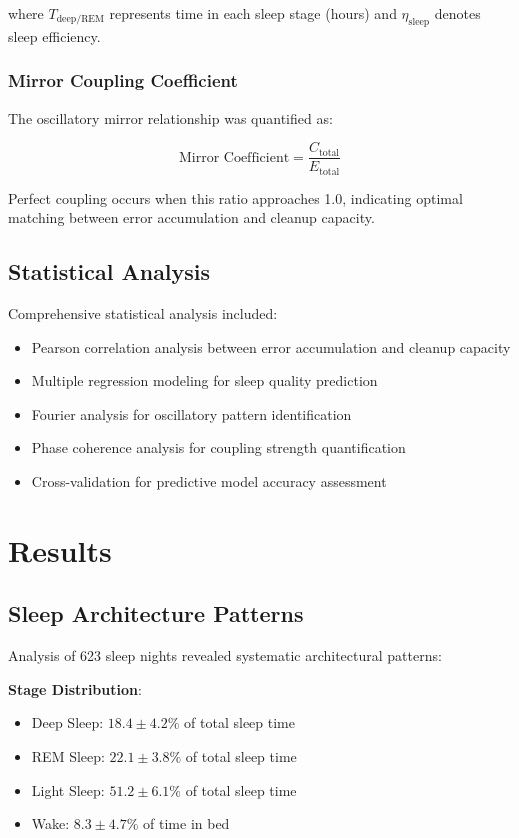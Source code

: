 \documentclass[twocolumn]{article}
\begin{document}
where $T_{\text{deep/REM}}$ represents time in each sleep stage (hours) and $\eta_{\text{sleep}}$ denotes sleep efficiency.

\subsubsection{Mirror Coupling Coefficient}

The oscillatory mirror relationship was quantified as:

\begin{equation}
\text{Mirror Coefficient} = \frac{C_{\text{total}}}{E_{\text{total}}}
\label{eq:mirror_coefficient}
\end{equation}

Perfect coupling occurs when this ratio approaches 1.0, indicating optimal matching between error accumulation and cleanup capacity.

\subsection{Statistical Analysis}

Comprehensive statistical analysis included:

\begin{itemize}
\item Pearson correlation analysis between error accumulation and cleanup capacity
\item Multiple regression modeling for sleep quality prediction
\item Fourier analysis for oscillatory pattern identification
\item Phase coherence analysis for coupling strength quantification
\item Cross-validation for predictive model accuracy assessment
\end{itemize}

\section{Results}

\subsection{Sleep Architecture Patterns}

Analysis of 623 sleep nights revealed systematic architectural patterns:

\textbf{Stage Distribution}:
\begin{itemize}
\item Deep Sleep: $18.4 \pm 4.2\%$ of total sleep time
\item REM Sleep: $22.1 \pm 3.8\%$ of total sleep time  
\item Light Sleep: $51.2 \pm 6.1\%$ of total sleep time
\item Wake: $8.3 \pm 4.7\%$ of time in bed
\end{itemize}
\end{document}
